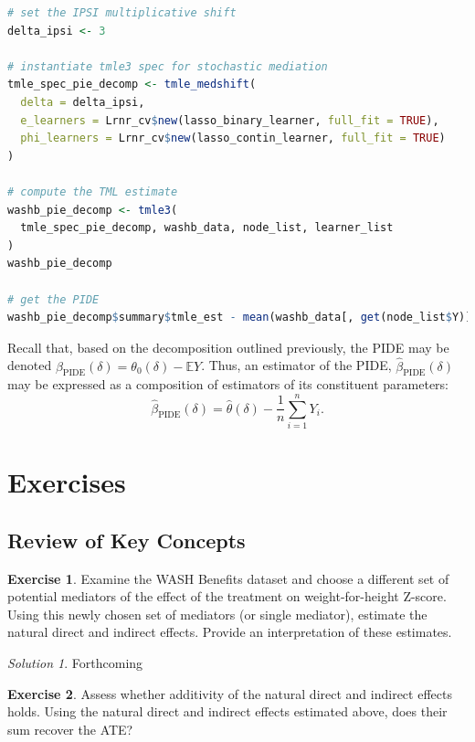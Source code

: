 \documentclass[
  12pt, krantz2,
]{krantz}
\newcommand{\1}{\mathbbm{1}}
\theoremstyle{definition}
\theoremstyle{definition}
\theoremstyle{definition}
\newtheorem{exercise}{Exercise}[chapter]
\theoremstyle{definition}
\theoremstyle{remark}
\newtheorem*{solution}{Solution}
\begin{document}
\begin{lstlisting}[language=R]
# set the IPSI multiplicative shift
delta_ipsi <- 3

# instantiate tmle3 spec for stochastic mediation
tmle_spec_pie_decomp <- tmle_medshift(
  delta = delta_ipsi,
  e_learners = Lrnr_cv$new(lasso_binary_learner, full_fit = TRUE),
  phi_learners = Lrnr_cv$new(lasso_contin_learner, full_fit = TRUE)
)

# compute the TML estimate
washb_pie_decomp <- tmle3(
  tmle_spec_pie_decomp, washb_data, node_list, learner_list
)
washb_pie_decomp

# get the PIDE
washb_pie_decomp$summary$tmle_est - mean(washb_data[, get(node_list$Y)])
\end{lstlisting}

Recall that, based on the decomposition outlined previously, the PIDE may be
denoted \(\beta_{\text{PIDE}}(\delta) = \theta_0(\delta) - \mathbb{E}Y\). Thus,
an estimator of the PIDE, \(\hat{\beta}_{\text{PIDE}}(\delta)\) may be expressed
as a composition of estimators of its constituent parameters:
\begin{equation*}
  \hat{\beta}_{\text{PIDE}}({\delta}) = \hat{\theta}(\delta) -
  \frac{1}{n} \sum_{i = 1}^n Y_i.
\end{equation*}

\hypertarget{exercises-4}{%
\section{Exercises}\label{exercises-4}}

\hypertarget{review-of-key-concepts-3}{%
\subsection{Review of Key Concepts}\label{review-of-key-concepts-3}}

\begin{exercise}
Examine the WASH Benefits dataset and choose a different set of potential
mediators of the effect of the treatment on weight-for-height Z-score. Using
this newly chosen set of mediators (or single mediator), estimate the natural
direct and indirect effects. Provide an interpretation of these estimates.
\end{exercise}

\begin{solution}
Forthcoming
\end{solution}

\begin{exercise}
Assess whether additivity of the natural direct and indirect effects holds.
Using the natural direct and indirect effects estimated above, does their sum
recover the ATE?
\end{exercise}
\end{document}
